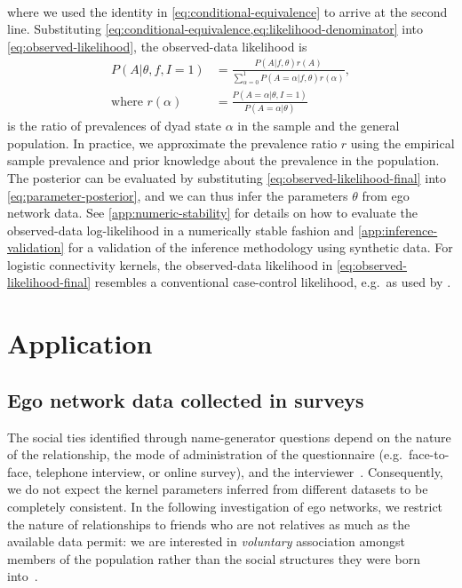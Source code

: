 \documentclass{scrartcl}
\begin{document}
\begin{refsection}
\begin{align}
\end{align}
where we used the identity in \cref{eq:conditional-equivalence} to arrive at the second line. Substituting \cref{eq:conditional-equivalence,eq:likelihood-denominator} into \cref{eq:observed-likelihood}, the observed-data likelihood is
\begin{align}
    P(A|\theta,f,I=1)&=\frac{P(A|f,\theta)r(A)}{\sum_{\alpha=0}^1 P(A=\alpha|f,\theta)r(\alpha)},\label{eq:observed-likelihood-final}\\
    \text{where }r(\alpha)&=\frac{P(A=\alpha|\theta,I=1)}{P(A=\alpha|\theta)}\nonumber
\end{align}
is the ratio of prevalences of dyad state $\alpha$ in the sample and the general population. In practice, we approximate the prevalence ratio $r$ using the empirical sample prevalence and prior knowledge about the prevalence in the population. The posterior can be evaluated by substituting \cref{eq:observed-likelihood-final} into \cref{eq:parameter-posterior}, and we can thus infer the parameters $\theta$ from ego network data. See \cref{app:numeric-stability} for details on how to evaluate the observed-data log-likelihood in a numerically stable fashion and \cref{app:inference-validation} for a validation of the inference methodology using synthetic data. For logistic connectivity kernels, the observed-data likelihood in \cref{eq:observed-likelihood-final} resembles a conventional case-control likelihood, e.g.\ as used by \textcite{Smith2014}.

\section{Application\label{sec:application}}

\subsection{Ego network data collected in surveys}

The social ties identified through name-generator questions depend on the nature of the relationship, the mode of administration of the questionnaire (e.g.\ face-to-face, telephone interview, or online survey), and the interviewer~\cite{Marin2004,Eagle2015}. Consequently, we do not expect the kernel parameters inferred from different datasets to be completely consistent. In the following investigation of ego networks, we restrict the nature of relationships to friends who are not relatives as much as the available data permit: we are interested in \emph{voluntary} association amongst members of the population rather than the social structures they were born into~\cite{Kalmijn2007}.


\end{refsection}
\end{document}
